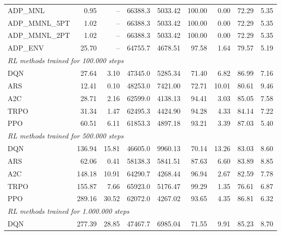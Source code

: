\begin{samepage}
\begin{center}
\begin{tabular}{l|rr|rr|rr|rr}
    ADP\_MNL     &     0.95 &    -- &    66388.3 &    5033.42 &  100.00 &    0.00 &   72.29 &    5.35 \\
    ADP\_MMNL\_5PT &     1.02 &    -- &    66388.3 &    5033.42 &  100.00 &    0.00 &   72.29 &    5.35 \\
    ADP\_MMNL\_2PT &     1.02 &    -- &    66388.3 &    5033.42 &  100.00 &    0.00 &   72.29 &    5.35 \\
    ADP\_ENV     &    25.70 &    -- &    64755.7 &    4678.51 &   97.58 &    1.64 &   79.57 &    5.19 \\
    \midrule
    \multicolumn{9}{l}{\textit{RL methods trained for 100.000 steps}} \\
    \midrule
    DQN          &    27.64 &     3.10 &    47345.0 &    5285.34 &   71.40 &    6.82 &   86.99 &    7.16 \\
    ARS          &    12.41 &     0.10 &    48253.0 &    7421.00 &   72.71 &   10.01 &   80.61 &    9.46 \\
    A2C          &    28.71 &     2.16 &    62599.0 &    4138.13 &   94.41 &    3.03 &   85.05 &    7.58 \\
    TRPO         &    31.34 &     1.47 &    62495.3 &    4424.90 &   94.28 &    4.33 &   84.14 &    7.22 \\
    PPO          &    60.51 &     6.11 &    61853.3 &    4897.18 &   93.21 &    3.39 &   87.03 &    5.40 \\
    \midrule
    \multicolumn{9}{l}{\textit{RL methods trained for 500.000 steps}} \\
    \midrule
    DQN          &   136.94 &    15.81 &    46605.0 &    9960.13 &   70.14 &   13.26 &   83.03 &    8.60 \\
    ARS          &    62.06 &     0.41 &    58138.3 &    5841.51 &   87.63 &    6.60 &   83.89 &    8.85 \\
    A2C          &   148.18 &    10.91 &    64290.7 &    4268.44 &   96.94 &    2.67 &   82.59 &    7.78 \\
    TRPO         &   155.87 &     7.66 &    65923.0 &    5176.47 &   99.29 &    1.35 &   76.61 &    6.87 \\
    PPO          &   289.16 &    30.52 &    62072.0 &    4267.02 &   93.65 &    4.35 &   86.81 &    6.32 \\
    \midrule
    \multicolumn{9}{l}{\textit{RL methods trained for 1.000.000 steps}} \\
    \midrule
    DQN          &   277.39 &    28.85 &    47467.7 &    6985.04 &   71.55 &    9.91 &   85.23 &    8.70 \\

\end{tabular}
\end{center}
\end{samepage}
